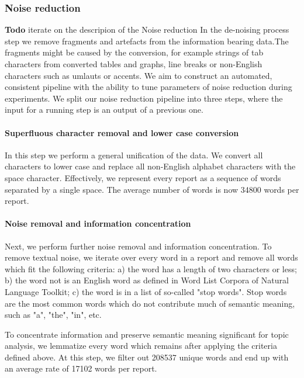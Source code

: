 \documentclass[12pt,journal,letterpaper,oneside,onecolumn]{IEEEtran}
\begin{document}
\subsubsection{Noise reduction}
\textbf{Todo} iterate on the descripion of the Noise reduction
In the de-noising process step we remove fragments and artefacts from the information bearing data.The fragments might be caused by the conversion, for example strings of tab characters from converted tables and graphs, line breaks or non-English characters such as umlauts or accents.
We aim to construct an automated, consistent pipeline with the ability to tune parameters of noise reduction during experiments. We split our noise reduction pipeline into three steps, where the input for a running step is an output of a previous one.

\paragraph{Superfluous character removal and lower case conversion}
In this step we perform a general unification of the data. We convert all characters to lower case and replace all non-English alphabet characters with the space character. Effectively, we represent every report as a sequence of words separated by a single space. The average number of words is now 34800 words per report.

\paragraph{Noise removal and information concentration}
Next, we perform further noise removal and information concentration. To remove textual noise, we iterate over every word in a report and remove all words which fit the following criteria: a) the word has a length of two characters or less; b) the word not is an English word as defined in Word List Corpora of Natural Language Toolkit\cite{nltk_book_2009}; c) the word is in a list of so-called "stop words".
Stop words are the most common words which do not contribute much of semantic meaning, such as "a", "the", "in", etc. 

To concentrate information and preserve semantic meaning significant for topic analysis, we lemmatize every word which remains after applying the criteria defined above. At this step, we filter out 208537 unique words and end up with an average rate of 17102 words per report.
\end{document}
